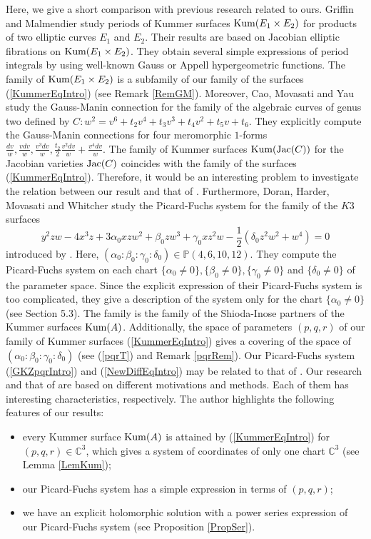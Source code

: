 \documentclass[10pt]{article}
\begin{document}
Here, we give a short comparison with  previous research related to ours.
Griffin and Malmendier  \cite{GM}  study periods of Kummer surfaces ${\rm Kum}(E_1 \times E_2)$ for products of two elliptic curves $E_1$ and $E_2$.
Their results are based on Jacobian elliptic fibrations on ${\rm Kum}(E_1 \times E_2)$.
They obtain several simple expressions of period integrals by using well-known Gauss or Appell hypergeometric functions.
The family of ${\rm Kum}(E_1 \times E_2)$ is a subfamily of our family of the surfaces (\ref{KummerEqIntro}) (see Remark \ref{RemGM}).
Moreover, Cao, Movasati and Yau \cite{CMY} study the Gauss-Manin connection for the family of the algebraic curves of genus two defined by $C: w^2=v^6 + t_2 v^4 + t_3 v^3 + t_4 v^2 + t_5 v + t_6 $.
They explicitly compute the Gauss-Manin connections for four meromorphic $1$-forms $\frac{dv}{w}, \frac{v dv}{w}, \frac{v^3 dv}{w}, \frac{t_2}{2} \frac{v^2 dv}{w} +\frac{v^4 dv}{w}$.
The family of Kummer surfaces ${\rm Kum}({\rm Jac}(C))$ for the Jacobian varieties ${\rm Jac}(C)$ coincides with the family of the surfaces (\ref{KummerEqIntro}).
Therefore, it would be an interesting problem to investigate the relation between our result and that of \cite{CMY}.
Furthermore, Doran, Harder, Movasati and Whitcher \cite{DHMW} study the Picard-Fuchs system for the family of the $K3$ surfaces
$$
y^2 z w -4 x^3 z + 3\alpha_0 x z w^2 +\beta_0 z w^3 + \gamma_0 x z^2 w -\frac{1}{2} (\delta_0 z^2 w^2 + w^4) =0
$$
introduced by \cite{CD}.
Here, $(\alpha_0:\beta_0 :\gamma_0:\delta_0) \in \mathbb{P}(4,6,10,12)$.
They compute the Picard-Fuchs system on each chart $\{\alpha_0\not =0\}, \{\beta_0\not =0\},\{\gamma_0\not =0\}$ and $\{\delta_0\not =0\}$ of the parameter space.
Since the explicit expression of their Picard-Fuchs system is too complicated,
 they give a description of the system only for the chart $\{\alpha_0\not =0\}$ (see \cite{DHMW} Section 5.3).
 The family \cite{CD} is the family of the Shioda-Inose partners of the Kummer surfaces ${\rm Kum}(A)$.
 Additionally, the  space of parameters $(p,q,r)$ of our family of Kummer surfaces (\ref{KummerEqIntro})  gives a covering of the  space of $(\alpha_0:\beta_0 :\gamma_0:\delta_0)$ (see (\ref{pqrT}) and Remark \ref{pqrRem}).
Our Picard-Fuchs system   (\ref{GKZpqrIntro}) and (\ref{NewDiffEqIntro})  may be related to that of \cite{DHMW}.
Our research and that of \cite{DHMW} are based on different motivations and methods.
Each of them has interesting characteristics, respectively. 
The author highlights the following features of our results:
\begin{itemize}
\item 
every Kummer surface ${\rm Kum}(A)$ is attained by (\ref{KummerEqIntro}) for  $(p,q,r)\in \mathbb{C}^3$,
which gives a system of coordinates of only one chart $\mathbb{C}^3$ (see Lemma \ref{LemKum});

\item
our Picard-Fuchs system has a simple expression in terms of $(p,q,r)$;

\item
we have an explicit holomorphic  solution with a power series expression of our Picard-Fuchs system (see Proposition \ref{PropSer}).
\end{itemize}
\end{document}
